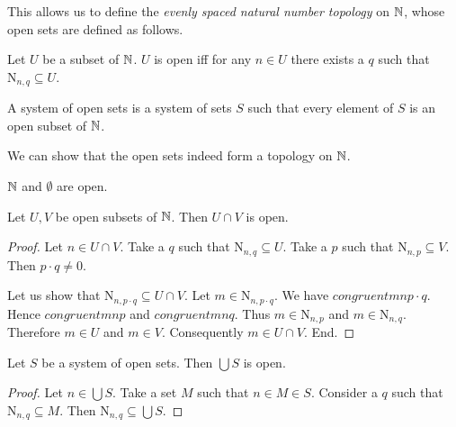 \documentclass{article}
\newcommand{\arithseq}[2]{\mathrm{N}_{#1,#2}}
\begin{document}
  This allows us to define the \textit{evenly spaced natural number
  topology} on $\mathbb{N}$, whose open sets are defined as follows.

  \begin{forthel}
    \begin{definition}
      Let $U$ be a subset of $\mathbb{N}$.
      $U$ is open iff for any $n \in U$ there exists a $q$ such that
      $\arithseq{n}{q} \subseteq U$.
    \end{definition}

    \begin{definition}
      A system of open sets is a system of sets $S$ such that every element of
      $S$ is an open subset of $\mathbb{N}$.
    \end{definition}
  \end{forthel}

  We can show that the open sets indeed form a topology on $\mathbb{N}$.

  \begin{forthel}
    \begin{lemma}
      $\mathbb{N}$ and $\emptyset$ are open.
    \end{lemma}

    \begin{lemma}
      Let $U,V$ be open subsets of $\mathbb{N}$.
      Then $U \cap V$ is open.
    \end{lemma}
    \begin{proof}
      Let $n \in U \cap V$.
      Take a $q$ such that $\arithseq{n}{q} \subseteq U$.
      Take a $p$ such that $\arithseq{n}{p} \subseteq V$.
      Then $p \cdot q \neq 0$.

      Let us show that $\arithseq{n}{p \cdot q} \subseteq U \cap V$.
        Let $m \in \arithseq{n}{p \cdot q}$.
        We have $congruent{m}{n}{p \cdot q}$.
        Hence $congruent{m}{n}{p}$ and $congruent{m}{n}{q}$.
        Thus $m \in \arithseq{n}{p}$ and $m \in \arithseq{n}{q}$.
        Therefore $m \in U$ and $m \in V$.
        Consequently $m \in U \cap V$.
      End.
    \end{proof}

    \begin{lemma}
      Let $S$ be a system of open sets.
      Then $\bigcup S$ is open.
    \end{lemma}
    \begin{proof}
      Let $n \in \bigcup S$.
      Take a set $M$ such that $n \in M \in S$.
      Consider a $q$ such that $\arithseq{n}{q} \subseteq M$.
      Then $\arithseq{n}{q} \subseteq \bigcup S$.
    \end{proof}
  \end{forthel}
\end{document}
